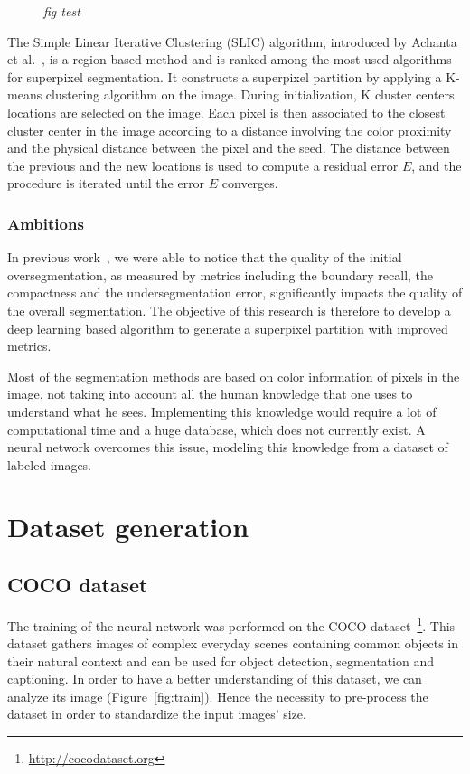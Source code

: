 \documentclass{article}
\begin{document}
            \begin{figure}[!ht]
                \centering
                \caption{\textit{fig test}}
            \end{figure}

            The Simple Linear Iterative Clustering (SLIC) algorithm, introduced by Achanta et al.~\cite{achanta2012,achanta2017}, is a region based method and is ranked among the most used algorithms for superpixel segmentation. It constructs a superpixel partition by applying a K-means clustering algorithm on the image. During initialization, K cluster centers locations are selected on the image. Each pixel is then associated to the closest cluster center in the image according to a distance involving the color proximity and the physical distance between the pixel and the seed. The distance between the previous and the new locations is used to compute a residual error $E$, and the procedure is iterated until the error $E$ converges.

        \subsubsection{Ambitions}
            In previous work~\cite{chang2019}, we were able to notice that the quality of the initial oversegmentation, as measured by metrics including the boundary recall, the compactness and the undersegmentation error, significantly impacts the quality of the overall segmentation. The objective of this research is therefore to develop a deep learning based algorithm to generate a superpixel partition with improved metrics.
            \par
            Most of the segmentation methods are based on color information of pixels in the image, not taking into account all the human knowledge that one uses to understand what he sees. Implementing this knowledge would require a lot of computational time and a huge database, which does not currently exist. A neural network overcomes this issue, modeling this knowledge from a dataset of labeled images.


\newpage
\section{Dataset generation}

    \subsection{COCO dataset}
        The training of the neural network was performed on the COCO dataset~\cite{microsoft2014}\footnote{\url{http://cocodataset.org}}. This dataset gathers images of complex everyday scenes containing common objects in their natural context and can be used for object detection, segmentation and captioning. In order to have a better understanding of this dataset, we can analyze its image (Figure~\ref{fig:train}). Hence the necessity to pre-process the dataset in order to standardize the input images' size.
\end{document}
